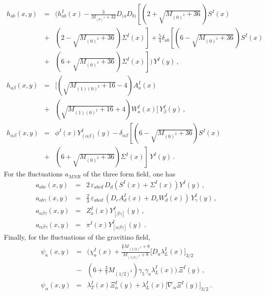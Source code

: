 \documentclass[a4paper,11pt]{article}
\newcommand{\ft}[2]{{\textstyle\frac{#1}{#2}}}
\begin{document}
\begin{eqnarray}
h_{ab}\left(x,y\right) &=& \Big( h_{ab}^I\left(x\right)
    - \frac{3}{M_{(0)^3}+32}D_{(a}D_{b)}
    \left[(2+\sqrt{M_{(0)^3}+36}\,) S^I\left(x\right)\right.
\nonumber\\ &+& \left.
(2-\sqrt{M_{(0)^3}+36}\,)\Sigma^I\left(x\right)\right]
    + \ft54 \delta_{ab}
    \left[(6-\sqrt{M_{(0)^3}+36}\,)S^I\left(x\right)\right.
\nonumber\\ &+& \left.
(6+\sqrt{M_{(0)^3}+36}\,)\Sigma^I\left(x\right)\right]
    \Big) \, Y^I \left(y\right)\,,
\label{kkexpansion}\\ h_{a\beta}\left(x,y\right) &=&
\big[(\sqrt{M_{(1)(0)^2}+16}-4)A_a^I\left(x\right) \nonumber\\ &+&
(\sqrt{M_{(1)(0)^2}+16}+4)W_a^I\left(x\right)\big] \, Y^I_\beta
    \left(y\right) \,,
\label{kkexpansion2}\\ h_{\alpha\beta}\left(x,y\right) &=&
\phi^I\left(x\right) Y^I_{(\alpha\beta)}\left(y\right) -
    \delta_{\alpha\beta}
    \left[(6-\sqrt{M_{(0)^3}+36}) S^I\left(x\right)\right.
\nonumber \\ &+& \left.  (6+\sqrt{M_{(0)^3}+36})\Sigma^I
    \left(x\right)\right] \, Y^I\left(y\right)~.
\label{kkexpansion3}
\end{eqnarray}
For the fluctuations $a_{MNR}$ of the three form field, one has
\begin{eqnarray}
\label{kkexpansionA} a_{abc}\left(x,y\right) &=& 2 \,
\varepsilon_{abcd} \,D_d (S^I\left(x\right)+
    \Sigma^I\left(x\right)) Y^I\left(y\right) \,,
\nonumber \\ a_{ab\gamma}\left(x,y\right)
             &=& \ft23 \, \varepsilon_{abcd} \,
            (D_c A_d^I\left(x\right) + D_c W_d^I\left(x\right))\,
        Y_\gamma^I\left(y\right) \,,
\nonumber \\ a_{a\beta\gamma}\left(x,y\right)
             &=& Z_a^I\left(x\right) Y^I_{[\beta\gamma]}\left(y\right) \,,
\\
a_{\alpha\beta\gamma}\left(x,y\right)
            &=& \pi^I\left(x\right) Y^I_{[\alpha\beta\gamma]}\left(y\right)~.
\end{eqnarray}
Finally, for the fluctuations of the gravitino field,
\begin{eqnarray}
\psi_a\left(x,y\right)
            &=& \Big(
                \chi_a^I\left(x\right) +
        \frac{\ft47 M_{(1/2)^3}+8}{M_{(1/2)^3}+8}
                \big[D_a \lambda_L^I\left(x\right) \big]_{3/2}
\nonumber\\ &-&    (6+\ft37 M_{(1/2)^3})\gamma_5\gamma_a
\lambda_L^I \left(x\right)
           \Big) \, \Xi^I\left(y\right) \,,
\label{kkexpansionpsi}\\ \psi_\alpha(x,y) &=&
\lambda_T^I\left(x\right) \Xi_\alpha^I\left(y\right) +
                \lambda_L^I\left(x\right)
                \big[ \nabla_\alpha \Xi ^I\left(y\right) \big]_{3/2}~.
\label{kkexpansionlam}
\end{eqnarray}
\end{document}
